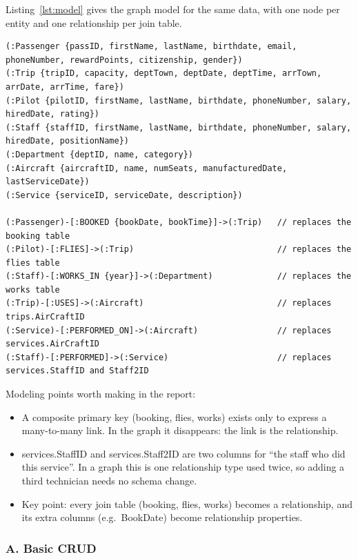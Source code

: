 \documentclass[11pt,a4paper]{article}
\begin{document}
Listing~\ref{lst:model} gives the graph model for the same data, with one node per entity and one relationship per join table.

\begin{lstlisting}[caption={Property graph model for the el\_paso\_airport data},label={lst:model}]
(:Passenger {passID, firstName, lastName, birthdate, email, phoneNumber, rewardPoints, citizenship, gender})
(:Trip {tripID, capacity, deptTown, deptDate, deptTime, arrTown, arrDate, arrTime, fare})
(:Pilot {pilotID, firstName, lastName, birthdate, phoneNumber, salary, hiredDate, rating})
(:Staff {staffID, firstName, lastName, birthdate, phoneNumber, salary, hiredDate, positionName})
(:Department {deptID, name, category})
(:Aircraft {aircraftID, name, numSeats, manufacturedDate, lastServiceDate})
(:Service {serviceID, serviceDate, description})

(:Passenger)-[:BOOKED {bookDate, bookTime}]->(:Trip)   // replaces the booking table
(:Pilot)-[:FLIES]->(:Trip)                             // replaces the flies table
(:Staff)-[:WORKS_IN {year}]->(:Department)             // replaces the works table
(:Trip)-[:USES]->(:Aircraft)                           // replaces trips.AirCraftID
(:Service)-[:PERFORMED_ON]->(:Aircraft)                // replaces services.AirCraftID
(:Staff)-[:PERFORMED]->(:Service)                      // replaces services.StaffID and Staff2ID
\end{lstlisting}

Modeling points worth making in the report:

\begin{itemize}
  \item A composite primary key (booking, flies, works) exists only to express a many-to-many link. In the graph it disappears: the link is the relationship.
  \item services.StaffID and services.Staff2ID are two columns for ``the staff who did this service''. In a graph this is one relationship type used twice, so adding a third technician needs no schema change.
  \item Key point: every join table (booking, flies, works) becomes a relationship, and its extra columns (e.g.\ BookDate) become relationship properties.
\end{itemize}

\subsubsection*{A. Basic CRUD}
\end{document}
